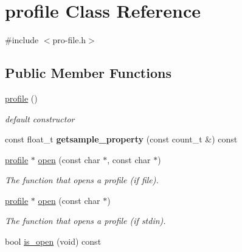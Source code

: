\hypertarget{classprofile}{\section{profile Class Reference}
\label{classprofile}
}


{\ttfamily \#include $<$pro-\/file.\-h$>$}

\subsection*{Public Member Functions}
\begin{DoxyCompactItemize}
\item 
\hypertarget{classprofile_a11becb1c5f72a18350e93675b0124052}{\hyperlink{classprofile_a11becb1c5f72a18350e93675b0124052}{profile} ()}\label{classprofile_a11becb1c5f72a18350e93675b0124052}

\begin{DoxyCompactList}\small\item\em default constructor \end{DoxyCompactList}\item 
\hypertarget{classprofile_a139d96163dc596a2b3d472aca45c97c3}{const float\-\_\-t {\bfseries getsample\-\_\-property} (const count\-\_\-t \&) const }\label{classprofile_a139d96163dc596a2b3d472aca45c97c3}

\item 
\hyperlink{classprofile}{profile} $\ast$ \hyperlink{classprofile_a50ea49f3b293f621848fb2375cd1eaa6}{open} (const char $\ast$, const char $\ast$)
\begin{DoxyCompactList}\small\item\em The function that opens a profile (if file). \end{DoxyCompactList}\item 
\hypertarget{classprofile_a2639e97ce5a52824c83e2071ba0fb7ee}{\hyperlink{classprofile}{profile} $\ast$ \hyperlink{classprofile_a2639e97ce5a52824c83e2071ba0fb7ee}{open} (const char $\ast$)}\label{classprofile_a2639e97ce5a52824c83e2071ba0fb7ee}

\begin{DoxyCompactList}\small\item\em The function that opens a profile (if stdin). \end{DoxyCompactList}\item 
\hypertarget{classprofile_a5a6e4ce6f7cca8d0e0e9c40ad855eea7}{bool \hyperlink{classprofile_a5a6e4ce6f7cca8d0e0e9c40ad855eea7}{is\-\_\-open} (void) const }\label{classprofile_a5a6e4ce6f7cca8d0e0e9c40ad855eea7}


\end{DoxyCompactItemize}
